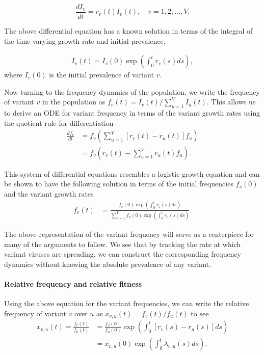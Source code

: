 \documentclass[11pt,oneside,letterpaper]{article}
\begin{document}
\begin{equation} \label{eq:inhomo_exp_growth}
    \frac{d I_{v}}{d t} = r_{v}(t) I_{v}(t), \quad v = 1,2, \ldots, V.
\end{equation}

The above differential equation has a known solution in terms of the integral of the time-varying growth rate and initial prevalence,

\begin{align}
I_{v}(t) = I_{v}(0) \exp\left( \int_{0}^{t} r_{v}(s) ds\right),
\end{align}
where $I_{v}(0)$ is the initial prevalence of variant $v$.

Now turning to the frequency dynamics of the population, we write the frequency of variant $v$ in the population as  $f_{v}(t) = I_{v}(t) / \sum_{u=1}^{V} I_{u}(t)$.
This allows us to derive an ODE for variant frequency in terms of the variant growth rates using the quotient rule for differentiation
\begin{align}
    \frac{d f_{v}}{d t} &= f_{v} \left( \sum_{u=1}^{V} [r_{v}(t) - r_{u}(t)] f_{u} \right)\\
                        &= f_{v} \left( r_{v}(t) - \sum_{u=1}^{V} r_{u}(t) f_{u} \right).
\end{align}

This system of differential equations resembles a logistic growth equation and can be shown to have the following solution in terms of the initial frequencies $f_{v}(0)$ and the variant growth rates
\begin{align}
    f_{v}(t) &= \frac{ f_{v}(0) \exp( \int_{0}^{t} r_{v}(s) ds)}{\sum_{u=1}^{V}  f_{u}(0) \exp( \int_{0}^{t} r_{u}(s) ds)}.
\end{align}

The above representation of the variant frequency will serve as a centerpiece for many of the arguments to follow.
We see that by tracking the rate at which variant viruses are spreading, we can construct the corresponding frequency dynamics without knowing the absolute prevalence of any variant.

\paragraph{Relative frequency and relative fitness}%

Using the above equation for the variant frequencies, we can write the relative frequency of variant $v$ over $u$ as $x_{v,u}(t) = f_{v}(t) / f_{u}(t)$ to see
\begin{align}
    x_{v, u}(t) = \frac{f_{v}(t)}{f_{u}(t)} &= \frac{f_{v}(0)}{f_{u}(0)} \exp \left( \int_{0}^{t} [r_{v}(s) - r_{u}(s)] ds \right)\\
                                            &=x_{v,u}(0)\exp \left( \int_{0}^{t} \lambda_{v,u}(s) ds \right).
\end{align}
\end{document}
